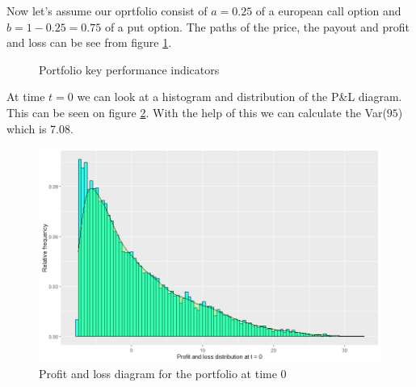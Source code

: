 \documentclass[a4paper, 12pt]{article}
\theoremstyle{definition}
\theoremstyle{plain}
\theoremstyle{definition}
\begin{document}
\newpage
Now let's assume our oprtfolio consist of $a = 0.25$ 
of a european call option and $b = 1- 0.25 = 0.75$ of 
a put option. 
The paths of the price, the payout and profit and loss 
can be see from figure \ref{fig:kpi}.

\begin{figure}[ht!]
    \centering
    \caption{Portfolio key performance indicators}
 \label{fig:kpi}
 \end{figure}

At time $t = 0$ we can look at a histogram and 
distribution of the P\&L diagram.
This can be seen on figure \ref{fig:port_pal_0}.
With the help of this we can calculate the 
Var($95$) which is 7.08. 

\begin{figure}[!ht]
    \centering
    \caption{Profit and loss diagram for the portfolio
            at time 0}
    \label{fig:port_pal_0}
    \includegraphics[scale=0.65]{portfolio_pal_0.png}
 \end{figure}
\end{document}
